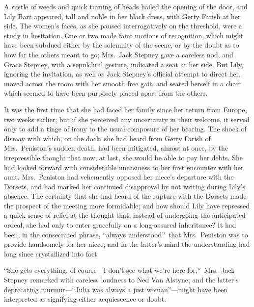 \documentclass[12pt,a4paper]{book}
\begin{document}
A rustle of weeds and quick turning of heads hailed the opening
of the door, and Lily Bart appeared, tall and noble in her black
dress, with Gerty Farish at her side. The women's faces, as she
paused interrogatively on the threshold, were a study in
hesitation. One or two made faint motions of recognition, which
might have been subdued either by the solemnity of the scene, or
by the doubt as to how far the others meant to go; Mrs.\ Jack
Stepney gave a careless nod, and Grace Stepney, with a sepulchral
gesture, indicated a seat at her side. But Lily, ignoring the
invitation, as well as Jack Stepney's official attempt to direct
her, moved across the room with her smooth free gait, and seated
herself in a chair which seemed to have been purposely placed
apart from the others.





It was the first time that she had faced her family since her
return from Europe, two weeks earlier; but if she perceived
any uncertainty in their welcome, it served only to add a tinge
of irony to the usual composure of her bearing. The shock of
dismay with which, on the dock, she had heard from Gerty Farish
of Mrs.\ Peniston's sudden death, had been mitigated, almost at
once, by the irrepressible thought that now, at last, she would
be able to pay her debts. She had looked forward with
considerable uneasiness to her first encounter with her aunt. 
Mrs.\ Peniston had vehemently opposed her niece's departure with
the Dorsets, and had marked her continued disapproval by not
writing during Lily's absence. The certainty that she had heard
of the rupture with the Dorsets made the prospect of the meeting
more formidable; and how should Lily have repressed a quick sense
of relief at the thought that, instead of undergoing the
anticipated ordeal, she had only to enter gracefully on a
long-assured inheritance? It had been, in the consecrated phrase,
``always understood''\ that Mrs.\ Peniston was to provide handsomely
for her niece; and in the latter's mind the understanding had
long since crystallized into fact.





``She gets everything, of course---I don't see what we're here
for,''\ Mrs.\ Jack Stepney remarked with careless loudness to Ned
Van Alstyne; and the latter's deprecating murmur---``Julia was
always a just woman''---might have been interpreted as signifying
either acquiescence or doubt.
\end{document}
